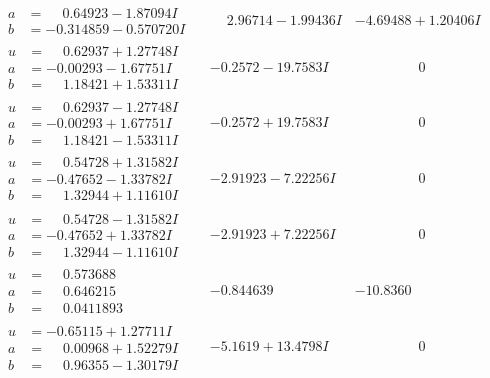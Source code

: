 \documentclass[1p]{elsarticle_modified}
\theoremstyle{definition}
\begin{document}
$$\begin{array}{c|c|c}
\begin{aligned}
a &= \phantom{-}0.64923 - 1.87094 I \\
b &= -0.314859 - 0.570720 I\end{aligned}
 & \phantom{-}2.96714 - 1.99436 I & -4.69488 + 1.20406 I \\ \hline\begin{aligned}
u &= \phantom{-}0.62937 + 1.27748 I \\
a &= -0.00293 - 1.67751 I \\
b &= \phantom{-}1.18421 + 1.53311 I\end{aligned}
 & -0.2572 - 19.7583 I & \phantom{-0.000000 } 0 \\ \hline\begin{aligned}
u &= \phantom{-}0.62937 - 1.27748 I \\
a &= -0.00293 + 1.67751 I \\
b &= \phantom{-}1.18421 - 1.53311 I\end{aligned}
 & -0.2572 + 19.7583 I & \phantom{-0.000000 } 0 \\ \hline\begin{aligned}
u &= \phantom{-}0.54728 + 1.31582 I \\
a &= -0.47652 - 1.33782 I \\
b &= \phantom{-}1.32944 + 1.11610 I\end{aligned}
 & -2.91923 - 7.22256 I & \phantom{-0.000000 } 0 \\ \hline\begin{aligned}
u &= \phantom{-}0.54728 - 1.31582 I \\
a &= -0.47652 + 1.33782 I \\
b &= \phantom{-}1.32944 - 1.11610 I\end{aligned}
 & -2.91923 + 7.22256 I & \phantom{-0.000000 } 0 \\ \hline\begin{aligned}
u &= \phantom{-}0.573688\phantom{ +0.000000I} \\
a &= \phantom{-}0.646215\phantom{ +0.000000I} \\
b &= \phantom{-}0.0411893\phantom{ +0.000000I}\end{aligned}
 & -0.844639\phantom{ +0.000000I} & -10.8360\phantom{ +0.000000I} \\ \hline\begin{aligned}
u &= -0.65115 + 1.27711 I \\
a &= \phantom{-}0.00968 + 1.52279 I \\
b &= \phantom{-}0.96355 - 1.30179 I\end{aligned}
 & -5.1619 + 13.4798 I & \phantom{-0.000000 } 0 \\ \hline\begin{aligned}

\end{aligned}
\end{array}$$
\end{document}
